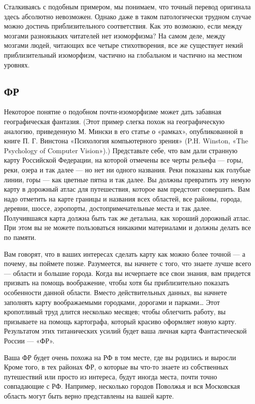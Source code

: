 \documentclass[../main.tex]{subfiles}
\begin{document}
Сталкиваясь с подобным примером, мы понимаем, что точный перевод оригинала здесь абсолютно невозможен. Однако даже в таком патологически трудном случае можно достичь приблизительного соответствия. Как это возможно, если между мозгами разноязыких читателей нет изоморфизма? На самом деле, между мозгами людей, читающих все четыре стихотворения, все же существует некий приблизительный изоморфизм, частично на глобальном и частично на местном уровнях.


\subsection{ФР}

Некоторое понятие о подобном почти-изоморфизме может дать забавная географическая фантазия. (Этот пример слегка похож на географическую аналогию, приведенную М. Мински в его статье о «рамках», опубликованной в книге П. Г. Винстона «Психология компьютерного зрения» (P.H. Winston, «The Psychology of Computer Vision»).) Представьте себе, что вам дали странную карту Российской Федерации, на которой отмечены все черты рельефа --- горы, реки, озера и так далее --- но нет ни одного названия. Реки показаны как голубые линии, горы --- как цветные пятна и так далее. Вы должны превратить эту немую карту в дорожный атлас для путешествия, которое вам предстоит совершить. Вам надо отметить на карте границы и названия всех областей, все районы, города, деревни, шоссе, аэропорты, достопримечательные места и так далее. Получившаяся карта должна быть так же детальна, как хороший дорожный атлас. При этом вы не можете пользоваться никакими материалами и должны делать все по памяти.

Вам говорят, что в ваших интересах сделать карту как можно более точной --- а почему, вы поймете позже. Разумеется, вы начнете с того, что знаете лучше всего --- области и большие города. Когда вы исчерпаете все свои знания, вам придется призвать на помощь воображение, чтобы хотя бы приблизительно показать особенности данной области. Вместо действительных данных, вы начнете заполнять карту воображаемыми городками, дорогами и парками\ldots{} Этот кропотливый труд длится несколько месяцев; чтобы облегчить работу, вы призываете на помощь картографа, который красиво оформляет новую карту. Результатом этих титанических усилий будет ваша личная карта Фантастической России --- «ФР».

Ваша ФР будет очень похожа на РФ в том месте, где вы родились и выросли Кроме того, в тех районах ФР, о которые вы что-то знаете из собственных путешествий или просто из интереса, будут иногда места, почти точно совпадающие с РФ. Например, несколько городов Поволжья и вся Московская область могут быть верно представлены на вашей карте.
\end{document}
